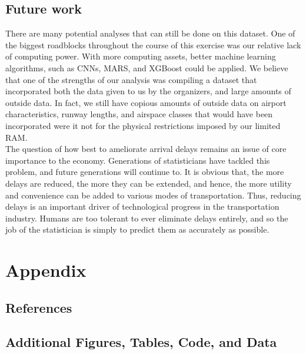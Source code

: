 \documentclass[12pt, a4paper, openany]{book}
\newcommand\tab[1][1cm]{\hspace*{#1}}
\begin{document}
	\section{Future work}
	\tab There are many potential analyses that can still be done on this dataset. One of the biggest roadblocks throughout the course of this exercise was our relative lack of computing power. With more computing assets, better machine learning algorithms, such as CNNs, MARS, and XGBoost could be applied. We believe that one of the strengths of our analysis was compiling a dataset that incorporated both the data given to us by the organizers, and large amounts of outside data. In fact, we still have copious amounts of outside data on airport characteristics, runway lengths, and airspace classes that would have been incorporated were it not for the physical restrictions imposed by our limited RAM. \\
	\tab The question of how best to ameliorate arrival delays remains an issue of core importance to the economy. Generations of statisticians have tackled this problem, and future generations will continue to. It is obvious that, the more delays are reduced, the more they can be extended, and hence, the more utility and convenience can be added to various modes of transportation. Thus, reducing delays is an important driver of technological progress in the transportation industry. Humans are too tolerant to ever eliminate delays entirely, and so the job of the statistician is simply to predict them as accurately as possible. 
\chapter{Appendix}
	\section{References}
	\section{Additional Figures, Tables, Code, and Data}
\pagebreak


\nocite{*}

\end{document}
